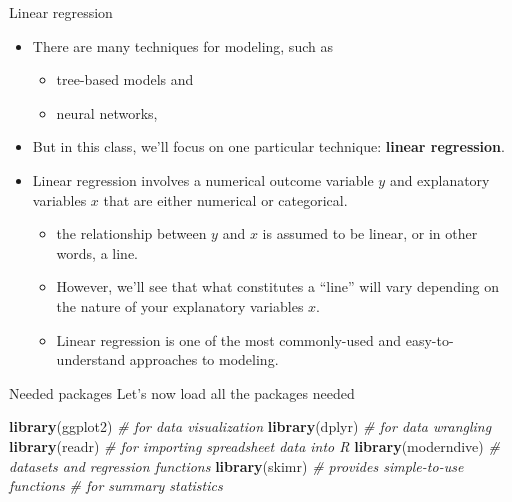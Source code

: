 \documentclass[
  ignorenonframetext,
]{beamer}
\newenvironment{Shaded}{\begin{snugshade}}{\end{snugshade}}
\newcommand{\CommentTok}[1]{\textcolor[rgb]{0.56,0.35,0.01}{\textit{#1}}}
\newcommand{\FunctionTok}[1]{\textcolor[rgb]{0.13,0.29,0.53}{\textbf{#1}}}
\newcommand{\NormalTok}[1]{#1}
\providecommand{\tightlist}{%
  \setlength{\itemsep}{0pt}\setlength{\parskip}{0pt}}
\begin{document}
\begin{frame}{Linear regression}
\label{linear-regression}
\begin{itemize}
\item
  There are many techniques for modeling, such as

  \begin{itemize}
  \tightlist
  \item
    tree-based models and
  \item
    neural networks,
  \end{itemize}
\item
  But in this class, we'll focus on one particular technique:
  \textbf{linear regression}.
\item
  Linear regression involves a numerical outcome variable \(y\) and
  explanatory variables \(x\) that are either numerical or categorical.

  \begin{itemize}
  \tightlist
  \item
    the relationship between \(y\) and \(x\) is assumed to be linear, or
    in other words, a line.
  \item
    However, we'll see that what constitutes a ``line'' will vary
    depending on the nature of your explanatory variables \(x\).
  \item
    Linear regression is one of the most commonly-used and
    easy-to-understand approaches to modeling.
  \end{itemize}
\end{itemize}
\end{frame}

\begin{frame}[fragile]{Needed packages}
\label{needed-packages}
Let's now load all the packages needed

\normalsize

\begin{Shaded}
\begin{Highlighting}[]
\FunctionTok{library}\NormalTok{(ggplot2)    }\CommentTok{\#  for data visualization}
\FunctionTok{library}\NormalTok{(dplyr)      }\CommentTok{\#  for data wrangling}
\FunctionTok{library}\NormalTok{(readr)      }\CommentTok{\#  for importing spreadsheet data into R}
\FunctionTok{library}\NormalTok{(moderndive) }\CommentTok{\#  datasets and regression functions}
\FunctionTok{library}\NormalTok{(skimr)      }\CommentTok{\#  provides simple{-}to{-}use functions }
                    \CommentTok{\#  for summary statistics}
\end{Highlighting}
\end{Shaded}

\normalsize
\end{frame}
\end{document}

